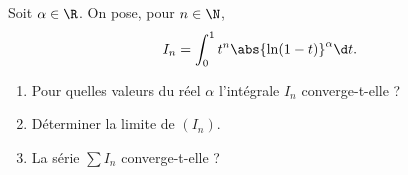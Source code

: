 \begin{enonce}
\begin{exercise}[ID={RMS135 E1473},subtitle={IMT MP 2024},tags={},difficulty={}]

Soit $\alpha \in \R$. On pose, pour $n \in \N$,
\begin{equation*}
I_n = \int_0^1 t^n \abs{\ln(1 - t)}^\alpha  \d t.
\end{equation*}

\begin{enumerate}
  \item Pour quelles valeurs du réel $\alpha$ l’intégrale $I_n$ converge-t-elle ?
  \item Déterminer la limite de $(I_n)$.
  \item La série $\sum I_n$ converge-t-elle ?
\end{enumerate}

\end{exercise}
\begin{solution}
\end{solution}
\end{enonce}
